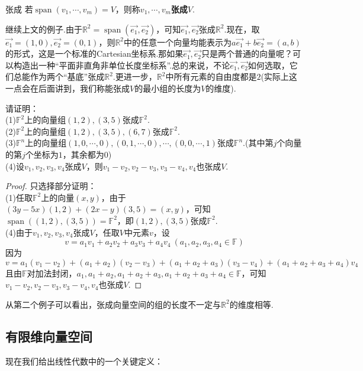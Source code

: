 \documentclass[lang=cn, zihao=5]{elegantbook}
\newcommand{\xl}[1]{\overrightarrow{#1}}
\newcommand{\R}{\mathbb{R}}
\newcommand{\F}{\mathbb{F}}
\DeclareMathOperator{\spn}{span}
\begin{document}
\begin{definition}{张成}
	若$\spn (v_1, \cdots ,v_m) = V$，则称$v_1, \cdots ,v_m$\textbf{张成}$V$.
\end{definition}

继续上文的例子.由于$\R ^2 = \spn (\xl{e_1},\xl{e_2})$，可知$\xl{e_1},\xl{e_2}$张成$\R ^2$.现在，取$\xl{e_1} = (1,0),\xl{e_2} = (0,1)$，则$\R ^2$中的任意一个向量均能表示为$a\xl{e_1} + b\xl{e_2} = (a,b)$的形式，这是一个标准的Cartesian坐标系.那如果$\xl{e_1},\xl{e_2}$只是两个普通的向量呢？可以构造出一种“平面非直角非单位长度坐标系”.总的来说，不论$\xl{e_1},\xl{e_2}$如何选取，它们总能作为两个“基底”张成$\R ^2$.更进一步，$\R ^{2}$中所有元素的自由度都是$2$(实际上这一点会在后面讲到，我们称能张成$V$的最小组的长度为$V$的维度).

\begin{example}
	请证明： \\
	(1)$\F ^{2}$上的向量组$(1,2),(3,5)$张成$\F ^{2}$. \\
	(2)$\F ^{2}$上的向量组$(1,2),(3,5),(6,7)$张成$\F ^{2}$. \\
	(3)$\F ^{n}$上的向量组$(1,0,\cdots ,0),(0,1,\cdots ,0),\cdots , (0,0, \cdots ,1)$张成$\F ^{n}$.(其中第$j$个向量的第$j$个坐标为$1$，其余都为$0$) \\
	(4)设$v_1,v_2,v_3,v_4$张成$V$，则$v_1-v_2,v_2-v_3,v_3-v_4,v_4$也张成$V$.
\end{example}
\begin{proof}
	只选择部分证明： \\
	(1)任取$\F ^2$上的向量$(x,y)$，由于$(3y-5x)(1,2)+(2x-y)(3,5)=(x,y)$，可知$\spn ((1,2),(3,5)) = \F ^{2}$，即$(1,2),(3,5)$张成$\F ^{2}$. \\
	(4)由于$v_1,v_2,v_3,v_4$张成$V$，任取$V$中元素$v$，设$$v=a_1v_1 + a_2v_2 + a_3v_3 + a_4v_4~(a_1,a_2,a_3,a_4 \in \F )$$
	因为$$v = a_1(v_1-v_2) + (a_1+a_2)(v_2-v_3) + (a_1+a_2+a_3)(v_3-v_4) + (a_1+a_2+a_3+a_4)v_4$$
	且由$\F$对加法封闭，$a_1,a_1+a_2,a_1+a_2+a_3,a_1+a_2+a_3+a_4 \in \F$，可知$v_1-v_2,v_2-v_3,v_3-v_4,v_4$也张成$V$.
\end{proof}
\begin{remark}
	从第二个例子可以看出，张成向量空间的组的长度不一定与$\R ^2$的维度相等.
\end{remark}

\subsection{有限维向量空间}

现在我们给出线性代数中的一个关键定义：
\end{document}
